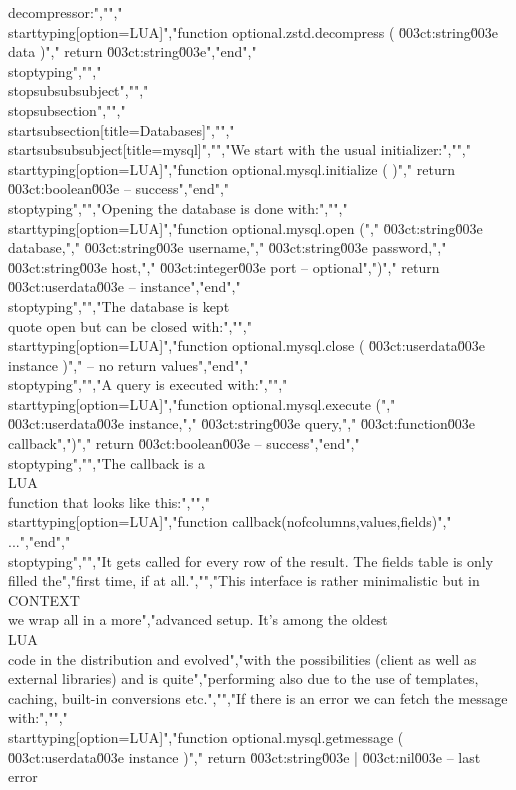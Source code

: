 decompressor:","","\\starttyping[option=LUA]","function optional.zstd.decompress ( \u003ct:string\u003e data )","    return \u003ct:string\u003e","end","\\stoptyping","","\\stopsubsubsubject","","\\stopsubsection","","\\startsubsection[title=Databases]","","\\startsubsubsubject[title=mysql]","","We start with the usual initializer:","","\\starttyping[option=LUA]","function optional.mysql.initialize ( )","    return \u003ct:boolean\u003e -- success","end","\\stoptyping","","Opening the database is done with:","","\\starttyping[option=LUA]","function optional.mysql.open (","    \u003ct:string\u003e  database,","    \u003ct:string\u003e  username,","    \u003ct:string\u003e  password,","    \u003ct:string\u003e  host,","    \u003ct:integer\u003e port -- optional",")","    return \u003ct:userdata\u003e -- instance","end","\\stoptyping","","The database is kept \\quote {open} but can be closed with:","","\\starttyping[option=LUA]","function optional.mysql.close ( \u003ct:userdata\u003e instance )","    -- no return values","end","\\stoptyping","","A query is executed with:","","\\starttyping[option=LUA]","function optional.mysql.execute (","    \u003ct:userdata\u003e instance,","    \u003ct:string\u003e   query,","    \u003ct:function\u003e callback",")","    return \u003ct:boolean\u003e -- success","end","\\stoptyping","","The callback is a \\LUA\\ function that looks like this:","","\\starttyping[option=LUA]","function callback(nofcolumns,values,fields)","    ...","end","\\stoptyping","","It gets called for every row of the result. The fields table is only filled the","first time, if at all.","","This interface is rather minimalistic but in \\CONTEXT\\ we wrap all in a more","advanced setup. It's among the oldest \\LUA\\ code in the distribution and evolved","with the possibilities (client as well as external libraries) and is quite","performing also due to the use of templates, caching, built-in conversions etc.","","If there is an error we can fetch the message with:","","\\starttyping[option=LUA]","function optional.mysql.getmessage ( \u003ct:userdata\u003e instance )","    return \u003ct:string\u003e | \u003ct:nil\u003e -- last error 